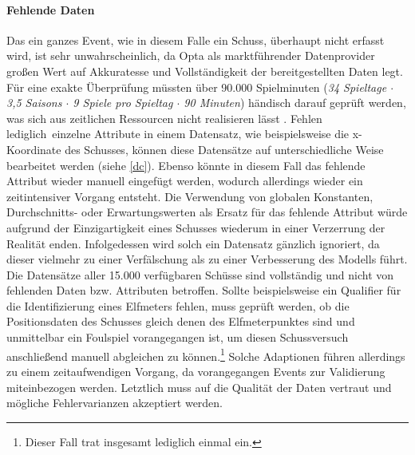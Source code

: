 \paragraph{Fehlende Daten}
Das ein ganzes Event, wie in diesem Falle ein Schuss, überhaupt nicht erfasst wird, ist sehr unwahrscheinlich, da Opta als marktführender Datenprovider großen Wert auf Akkuratesse und Vollständigkeit der bereitgestellten Daten legt. Für eine exakte Überprüfung müssten über 90.000 Spielminuten (\textit{34 Spieltage $\cdot$ 3,5 Saisons $\cdot$ 9 Spiele pro Spieltag $\cdot$ 90 Minuten}) händisch darauf geprüft werden, was sich aus zeitlichen Ressourcen nicht realisieren lässt	. Fehlen \glqq lediglich\grqq~einzelne Attribute in einem Datensatz, wie beispielsweise die x-Koordinate des Schusses, können diese Datensätze auf unterschiedliche Weise bearbeitet werden (siehe \vref{dc}). Ebenso könnte in diesem Fall das fehlende Attribut wieder manuell eingefügt werden, wodurch allerdings wieder ein zeitintensiver Vorgang entsteht. Die Verwendung von globalen Konstanten, Durchschnitts- oder Erwartungswerten als Ersatz für das fehlende Attribut würde aufgrund der Einzigartigkeit eines Schusses wiederum in einer Verzerrung der Realität enden. Infolgedessen wird solch ein Datensatz gänzlich ignoriert, da dieser vielmehr zu einer Verfälschung als zu einer Verbesserung des Modells führt. Die Datensätze aller 15.000 verfügbaren Schüsse sind vollständig und nicht von fehlenden Daten bzw. Attributen betroffen. Sollte beispielsweise ein Qualifier für die Identifizierung eines Elfmeters fehlen, muss geprüft werden, ob die Positionsdaten des Schusses gleich denen des Elfmeterpunktes sind und unmittelbar ein Foulspiel vorangegangen ist, um diesen Schussversuch anschließend manuell abgleichen zu können.\footnote{Dieser Fall trat insgesamt lediglich einmal ein.} Solche Adaptionen führen allerdings zu einem zeitaufwendigen Vorgang, da vorangegangen Events zur Validierung miteinbezogen werden. Letztlich muss auf die Qualität der Daten vertraut und mögliche Fehlervarianzen akzeptiert werden.

